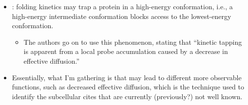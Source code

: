 \documentclass[basic,plain]{inVerba-notes}
\begin{document}
\begin{itemize}
\begin{itemize}
        \item {}: folding kinetics may trap a protein in a high-energy conformation, i.e., a high-energy intermediate conformation blocks access to the lowest-energy conformation. 
          \begin{itemize}
            \item The authors go on to use this phenomenon, stating that ``kinetic tapping is apparent from a local probe accumulation caused by a decrease in effective diffusion.''
          \end{itemize}
        \item Essentially, what I'm gathering is that  may lead to different more observable functions, such as decreased effective diffusion, which is the technique used to identify the subcellular cites that are currently (previously?) not well known.
      \end{itemize}
\end{itemize}
\end{document}
